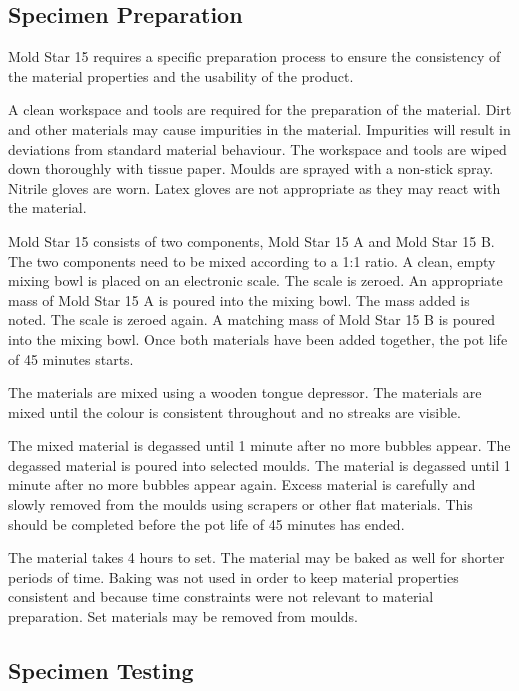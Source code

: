 \subsection{Specimen Preparation}

Mold Star 15 requires a specific preparation process to ensure the consistency of the material properties and the usability of the product.

A clean workspace and tools are required for the preparation of the material. Dirt and other materials may cause impurities in the material. Impurities will result in deviations from standard material behaviour. The workspace and tools are wiped down thoroughly with tissue paper. Moulds are sprayed with a non-stick spray. Nitrile gloves are worn. Latex gloves are not appropriate as they may react with the material.

Mold Star 15 consists of two components, Mold Star 15 A and Mold Star 15 B. The two components need to be mixed according to a 1:1 ratio. A clean, empty mixing bowl is placed on an electronic scale. The scale is zeroed. An appropriate mass of Mold Star 15 A is poured into the mixing bowl. The mass added is noted. The scale is zeroed again. A matching mass of Mold Star 15 B is poured into the mixing bowl. Once both materials have been added together, the pot life of 45 minutes starts.

The materials are mixed using a wooden tongue depressor. The materials are mixed until the colour is consistent throughout and no streaks are visible.

The mixed material is degassed until 1 minute after no more bubbles appear. The degassed material is poured into selected moulds. The material is degassed until 1 minute after no more bubbles appear again. Excess material is carefully and slowly removed from the moulds using scrapers or other flat materials. This should be completed before the pot life of 45 minutes has ended.

The material takes 4 hours to set. The material may be baked as well for shorter periods of time. Baking was not used in order to keep material properties consistent and because time constraints were not relevant to material preparation. Set materials may be removed from moulds.

\subsection{Specimen Testing}
